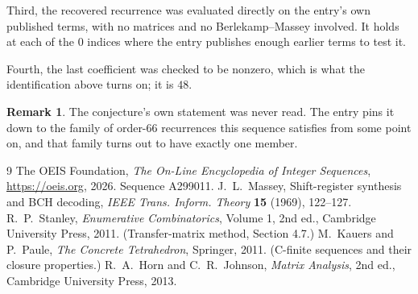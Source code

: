 \documentclass[11pt,a4paper]{article}
\theoremstyle{plain}
\theoremstyle{definition}
\newtheorem{remark}[theorem]{Remark}
\begin{document}
Third, the recovered recurrence was evaluated directly on the entry's own published terms, with
no matrices and no Berlekamp--Massey involved. It holds at each of the $0$ indices where
the entry publishes enough earlier terms to test it.

Fourth, the last coefficient was checked to be nonzero, which is what the identification above
turns on; it is $48$.

\begin{remark}
The conjecture's own statement was never read. The entry pins it down to the family of
order-$66$ recurrences this sequence satisfies from some point on, and that family turns
out to have exactly one member.
\end{remark}

\begin{thebibliography}{9}
 The OEIS Foundation, \emph{The On-Line Encyclopedia of Integer
Sequences}, \url{https://oeis.org}, 2026. Sequence A299011.
 J.~L.~Massey, Shift-register synthesis and BCH decoding, \emph{IEEE
Trans. Inform. Theory} \textbf{15} (1969), 122--127.
 R.~P.~Stanley, \emph{Enumerative Combinatorics}, Volume 1, 2nd ed.,
Cambridge University Press, 2011. (Transfer-matrix method, Section 4.7.)
 M.~Kauers and P.~Paule, \emph{The Concrete Tetrahedron}, Springer, 2011.
(C-finite sequences and their closure properties.)
 R.~A.~Horn and C.~R.~Johnson, \emph{Matrix Analysis}, 2nd ed., Cambridge
University Press, 2013.
\end{thebibliography}
\end{document}
